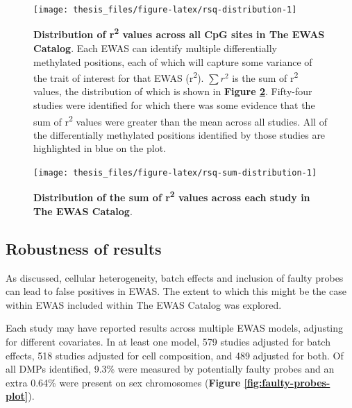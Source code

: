 \documentclass[11pt,twoside]{bristolthesis}
\begin{document}
\begin{figure}[!hp]

{\centering \texttt{[image: thesis\_files/figure-latex/rsq-distribution-1]} 

}

\caption[Distribution of r\textsuperscript{2} values across all CpG sites in The EWAS Catalog]{\textbf{Distribution of r\textsuperscript{2} values across all CpG sites in The EWAS Catalog}. Each EWAS can identify multiple differentially methylated positions, each of which will capture some variance of the trait of interest for that EWAS (r\textsuperscript{2}). \(\sum {r^2}\) is the sum of r\textsuperscript{2} values, the distribution of which is shown in \textbf{Figure \ref{fig:rsq-sum-distribution}}. Fifty-four studies were identified for which there was some evidence that the sum of r\textsuperscript{2} values were greater than the mean across all studies. All of the differentially methylated positions identified by those studies are highlighted in blue on the plot.}\label{fig:rsq-distribution}
\end{figure}



\begin{figure}[!hp]

{\centering \texttt{[image: thesis\_files/figure-latex/rsq-sum-distribution-1]} 

}

\caption[Distribution of the sum of r\textsuperscript{2} values across each study in The EWAS Catalog]{\textbf{Distribution of the sum of r\textsuperscript{2} values across each study in The EWAS Catalog}.}\label{fig:rsq-sum-distribution}
\end{figure}
\pagebreak

\hypertarget{robustness-of-results}{%
\subsection{Robustness of results}\label{robustness-of-results}}

As discussed, cellular heterogeneity, batch effects and inclusion of faulty probes can lead to false positives in EWAS. The extent to which this might be the case within EWAS included within The EWAS Catalog was explored.

Each study may have reported results across multiple EWAS models, adjusting for different covariates. In at least one model, 579 studies adjusted for batch effects, 518 studies adjusted for cell composition, and 489 adjusted for both. Of all DMPs identified, 9.3\% were measured by potentially faulty probes and an extra 0.64\% were present on sex chromosomes (\textbf{Figure \ref{fig:faulty-probes-plot}}).
\end{document}
